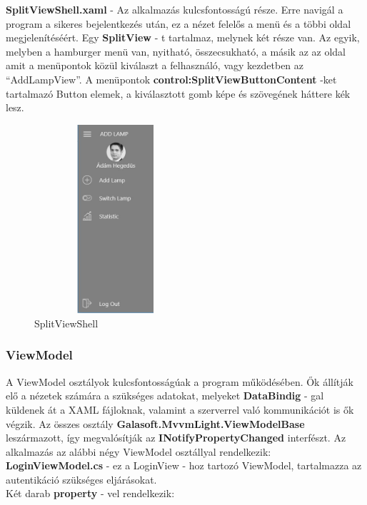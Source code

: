 \documentclass[a4paper,12pt]{report}
\begin{document}
    \textbf{SplitViewShell.xaml} - Az alkalmazás kulcsfontosságú része. Erre navigál a program a sikeres bejelentkezés után, ez a nézet
    felelős a menü és a többi oldal megjelenítéséért. Egy \textbf{SplitView} - t tartalmaz, melynek két része van. Az egyik, melyben a hamburger
    menü van, nyitható, összecsukható, a másik az az oldal amit a menüpontok közül kiválaszt a felhasználó, vagy kezdetben az ``AddLampView''.
    A menüpontok \textbf{control:SplitViewButtonContent} -ket tartalmazó Button elemek, a kiválasztott gomb képe és szövegének háttere kék lesz.

    \begin{figure}[H]
        \centering
        \includegraphics[width=6cm,height=7cm,keepaspectratio]{images/hamburgermenu.jpg}
        \caption{SplitViewShell}
        \label{fig: SplitViewShell}
    \end{figure}

    \subsubsection{ViewModel}
    A ViewModel osztályok kulcsfontosságúak a program működésében. Ők állítják elő a nézetek számára a szükséges adatokat, melyeket \textbf{DataBindig} - gal
    küldenek át a XAML fájloknak, valamint a szerverrel való kommunikációt is ők végzik. Az összes osztály \textbf{Galasoft.MvvmLight.ViewModelBase} leszármazott, így
    megvalósítják az \textbf{INotifyPropertyChanged} interfészt. Az alkalmazás az alábbi négy ViewModel osztállyal rendelkezik:\\

    \textbf{LoginViewModel.cs} - ez a LoginView - hoz tartozó ViewModel, tartalmazza az autentikáció szükséges eljárásokat. \\

    Két darab \textbf{property} - vel rendelkezik:
\end{document}
